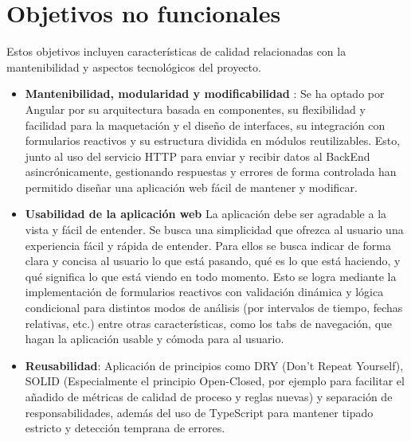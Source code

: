 \section{Objetivos no funcionales}

Estos objetivos incluyen características de calidad relacionadas con la mantenibilidad y aspectos tecnológicos del proyecto.

\begin{itemize}
  \item \textbf{Mantenibilidad, modularidad y modificabilidad }: Se ha optado por Angular por su arquitectura basada en componentes, su flexibilidad y facilidad para la maquetación y el diseño de interfaces, su integración con formularios reactivos y su estructura dividida en módulos reutilizables. Esto, junto al uso del servicio HTTP para enviar y recibir datos al BackEnd asincrónicamente, gestionando respuestas y errores de forma controlada han permitido diseñar una aplicación web fácil de mantener y modificar.
  
  \item \textbf{Usabilidad de la aplicación web} La aplicación debe ser agradable a la vista y fácil de entender. Se busca una simplicidad que ofrezca al usuario una experiencia fácil y rápida de entender. Para ellos se busca indicar de forma clara y concisa al usuario lo que está pasando, qué es lo que está haciendo, y qué significa lo que está viendo en todo momento. Esto se logra mediante la implementación de formularios reactivos con validación dinámica y lógica condicional para distintos modos de análisis (por intervalos de tiempo, fechas relativas, etc.) entre otras características, como los tabs de navegación, que hagan la aplicación usable y cómoda para al usuario.

  \item \textbf{Reusabilidad}: Aplicación de principios como DRY (Don't Repeat Yourself), SOLID (Especialmente el principio Open-Closed, por ejemplo para facilitar el añadido de métricas de calidad de proceso y reglas nuevas) y separación de responsabilidades, además del uso de TypeScript para mantener tipado estricto y detección temprana de errores.


\end{itemize}